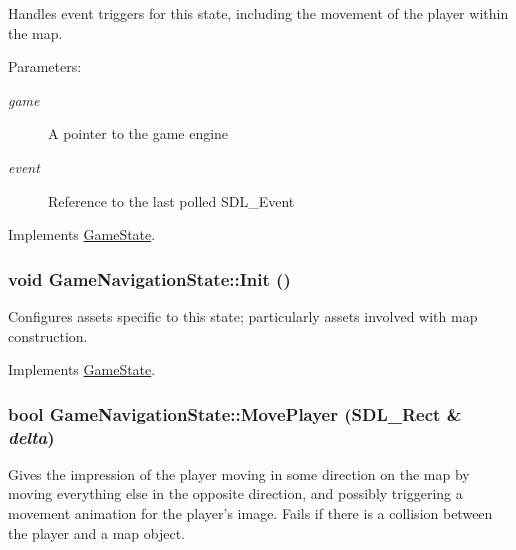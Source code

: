 Handles event triggers for this state, including the movement of the player within the map.

\begin{Desc}
\item[Parameters:]
\begin{description}
\item[{\em game}]A pointer to the game engine \item[{\em event}]Reference to the last polled SDL\_\-Event \end{description}
\end{Desc}


Implements \hyperlink{class_game_state_de7bd9bda91253614322ca0ea77b7a14}{GameState}.\hypertarget{class_game_navigation_state_8f613860bf544476ab9cff9fb7f98201}{
\subsubsection[{Init}]{\setlength{\rightskip}{0pt plus 5cm}void GameNavigationState::Init ()}}
\label{de/d2a/class_game_navigation_state_8f613860bf544476ab9cff9fb7f98201}


Configures assets specific to this state; particularly assets involved with map construction. 

Implements \hyperlink{class_game_state_eec488593bae214c0f738bd64dafba32}{GameState}.\hypertarget{class_game_navigation_state_40ef4ee4596f6e727e2f6bd7e2a352bf}{
\subsubsection[{MovePlayer}]{\setlength{\rightskip}{0pt plus 5cm}bool GameNavigationState::MovePlayer (SDL\_\-Rect \& {\em delta})}}
\label{de/d2a/class_game_navigation_state_40ef4ee4596f6e727e2f6bd7e2a352bf}


Gives the impression of the player moving in some direction on the map by moving everything else in the opposite direction, and possibly triggering a movement animation for the player's image. Fails if there is a collision between the player and a map object.

